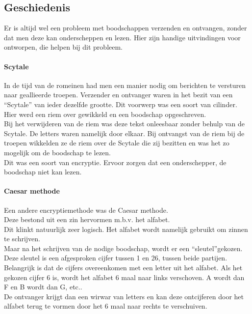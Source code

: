 \documentclass[12pt]{article}
\begin{document}
			\subsection{Geschiedenis}\label{Geschiedenis}
				Er is altijd wel een probleem met boodschappen verzenden en ontvangen, zonder dat men deze kan onderscheppen en lezen. Hier zijn handige uitvindingen voor ontworpen, 								die helpen bij dit probleem.

			\paragraph{Scytale}
				In de tijd van de romeinen had men een manier nodig om berichten te versturen naar geallieerde troepen. Verzender en ontvanger waren in het bezit van een 												\textquotedblleft Scytale\textquotedblright{} van ieder dezelfde grootte. Dit voorwerp was een soort van cilinder. Hier werd een riem over gewikkeld en een boodschap 						opgeschreven.\\
				Bij het verwijderen van de riem was deze tekst onleesbaar zonder behulp van de Scytale. De letters waren namelijk door elkaar. Bij ontvangst van de riem bij de 										troepen wikkelden ze de riem over de Scytale die zij bezitten en was het zo mogelijk om de boodschap te lezen.\\
				Dit was een soort van encryptie. Ervoor zorgen dat een onderschepper, de boodschap niet kan lezen.
			\paragraph{Caesar methode}
				Een andere encryptiemethode was de Caesar methode.\\
				Deze bestond uit een zin hervormen m.b.v. het alfabet.\\ 
				Dit klinkt natuurlijk zeer logisch.
				Het alfabet wordt namelijk gebruikt om zinnen te schrijven.\\
				Maar na het schrijven van de nodige boodschap, wordt er een \textquotedblleft sleutel\textquotedblright gekozen. Deze sleutel is een afgesproken cijfer tussen 1 en 26, tussen beide 					partijen.\\
				Belangrijk is dat de cijfers overeenkomen met een letter uit het alfabet. Als het gekozen cijfer 6 is, wordt het alfabet 6 maal naar links verschoven. A wordt dan F 									en B wordt dan G, etc..\\
				De ontvanger krijgt dan een wirwar van letters en kan deze ontcijferen door het alfabet terug te vormen door het 6 maal naar rechts te verschuiven.\\
\end{document}

